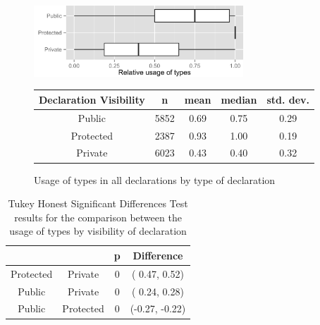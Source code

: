 \documentclass[msc]{ppgccufmg}
\renewcommand{\arraystretch}{1.2}
\begin{document}
\begin{figure}[h]
\centering 
\includegraphics[width=0.7\textwidth]{../aosd_2014/analysis/result/all/boxplots/23_declarations_by_visibility.png} 


\vspace{0.3cm}

\renewcommand{\arraystretch}{1.2}

\begin{tabular}{|c|c|c|c|c|}
\hline
Declaration Visibility	& n		& mean	& median	& std. dev.	\\
\hline
\hline
Public    				& 5852	& 0.69	& 0.75		& 0.29		\\ \hline
Protected 				& 2387	& 0.93	& 1.00		& 0.19		\\ \hline
Private   				& 6023	& 0.43	& 0.40		& 0.32		\\ \hline
\end{tabular}
\caption{Usage of types in all declarations by type of declaration}
\label{fig:all_boxplot_visibility_all} 
\end{figure}


\begin{table}[h]

\centering{}%
\renewcommand{\arraystretch}{1.2}

\begin{tabular}{|c|c|c|c|}
\hline 
								& {}		& p		& Difference	\\
\hline
\hline
Protected & Private & 0 & ( 0.47,  0.52) \\ \hline
Public & Private & 0 & ( 0.24,  0.28) \\ \hline
Public & Protected & 0 & (-0.27, -0.22) \\ \hline
\end{tabular}
\caption{Tukey Honest Significant Differences Test results for the comparison between the usage of types by visibility of declaration}
\label{tab:all_utest_visibility}
\end{table}
\end{document}

